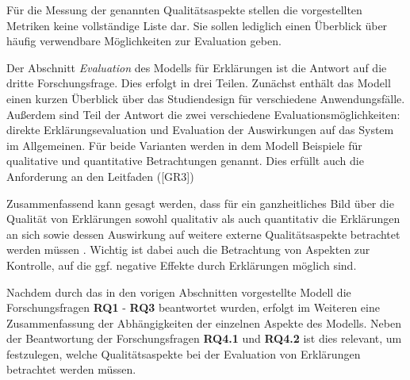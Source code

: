 Für die Messung der genannten Qualitätsaspekte stellen die vorgestellten Metriken keine vollständige Liste dar. Sie sollen lediglich einen Überblick über häufig verwendbare Möglichkeiten zur Evaluation geben.

\newpage

\noindent{}

\smallskip

Der Abschnitt \textit{Evaluation} des Modells für Erklärungen ist die Antwort auf die dritte Forschungsfrage. Dies erfolgt in drei Teilen. Zunächst enthält das Modell einen kurzen Überblick über das Studiendesign für verschiedene Anwendungsfälle. Außerdem sind Teil der Antwort die zwei verschiedene Evaluationsmöglichkeiten: direkte Erklärungsevaluation und Evaluation der Auswirkungen auf das System im Allgemeinen. Für beide Varianten werden in dem Modell Beispiele für qualitative und quantitative Betrachtungen genannt. Dies erfüllt auch die Anforderung an den Leitfaden ([GR3])

Zusammenfassend kann gesagt werden, dass für ein ganzheitliches Bild über die Qualität von Erklärungen sowohl qualitativ als auch quantitativ die Erklärungen an sich sowie dessen Auswirkung auf weitere externe Qualitätsaspekte betrachtet werden müssen \cite{balog_measuring_2020}. Wichtig ist dabei auch die Betrachtung von Aspekten zur Kontrolle, auf die ggf. negative Effekte durch Erklärungen möglich sind.

\bigskip

Nachdem durch das in den vorigen Abschnitten vorgestellte Modell die Forschungsfragen \textbf{RQ1} - \textbf{RQ3} beantwortet wurden, erfolgt im Weiteren eine Zusammenfassung der Abhängigkeiten der einzelnen Aspekte des Modells. Neben der Beantwortung der Forschungsfragen \textbf{RQ4.1} und \textbf{RQ4.2} ist dies relevant, um festzulegen, welche Qualitätsaspekte bei der Evaluation von Erklärungen betrachtet werden müssen.